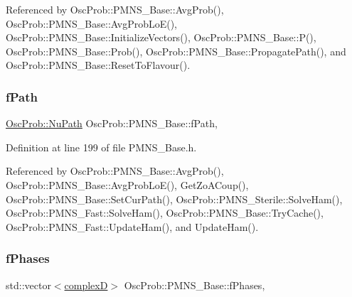 Referenced by Osc\+Prob\+::\+P\+M\+N\+S\+\_\+\+Base\+::\+Avg\+Prob(), Osc\+Prob\+::\+P\+M\+N\+S\+\_\+\+Base\+::\+Avg\+Prob\+Lo\+E(), Osc\+Prob\+::\+P\+M\+N\+S\+\_\+\+Base\+::\+Initialize\+Vectors(), Osc\+Prob\+::\+P\+M\+N\+S\+\_\+\+Base\+::\+P(), Osc\+Prob\+::\+P\+M\+N\+S\+\_\+\+Base\+::\+Prob(), Osc\+Prob\+::\+P\+M\+N\+S\+\_\+\+Base\+::\+Propagate\+Path(), and Osc\+Prob\+::\+P\+M\+N\+S\+\_\+\+Base\+::\+Reset\+To\+Flavour().

\mbox{\label{classOscProb_1_1PMNS__Base_a849437aa8891fe042e86886ce8f81c6e}} 
\subsubsection{\texorpdfstring{f\+Path}{fPath}}
{\footnotesize\ttfamily \hyperlink{structOscProb_1_1NuPath}{Osc\+Prob\+::\+Nu\+Path} Osc\+Prob\+::\+P\+M\+N\+S\+\_\+\+Base\+::f\+Path\hspace{0.3cm}{\ttfamily [protected]}, {\ttfamily [inherited]}}



Definition at line 199 of file P\+M\+N\+S\+\_\+\+Base.\+h.



Referenced by Osc\+Prob\+::\+P\+M\+N\+S\+\_\+\+Base\+::\+Avg\+Prob(), Osc\+Prob\+::\+P\+M\+N\+S\+\_\+\+Base\+::\+Avg\+Prob\+Lo\+E(), Get\+Zo\+A\+Coup(), Osc\+Prob\+::\+P\+M\+N\+S\+\_\+\+Base\+::\+Set\+Cur\+Path(), Osc\+Prob\+::\+P\+M\+N\+S\+\_\+\+Sterile\+::\+Solve\+Ham(), Osc\+Prob\+::\+P\+M\+N\+S\+\_\+\+Fast\+::\+Solve\+Ham(), Osc\+Prob\+::\+P\+M\+N\+S\+\_\+\+Base\+::\+Try\+Cache(), Osc\+Prob\+::\+P\+M\+N\+S\+\_\+\+Fast\+::\+Update\+Ham(), and Update\+Ham().

\mbox{\label{classOscProb_1_1PMNS__Base_ab8d26b722047d49d977f5f2d83026ede}} 
\subsubsection{\texorpdfstring{f\+Phases}{fPhases}}
{\footnotesize\ttfamily std\+::vector$<$\hyperlink{EigenPoint_8h_a67ca8e107e20610c3fff78d5e726ece0}{complexD}$>$ Osc\+Prob\+::\+P\+M\+N\+S\+\_\+\+Base\+::f\+Phases\hspace{0.3cm}{\ttfamily [protected]}, {\ttfamily [inherited]}}



